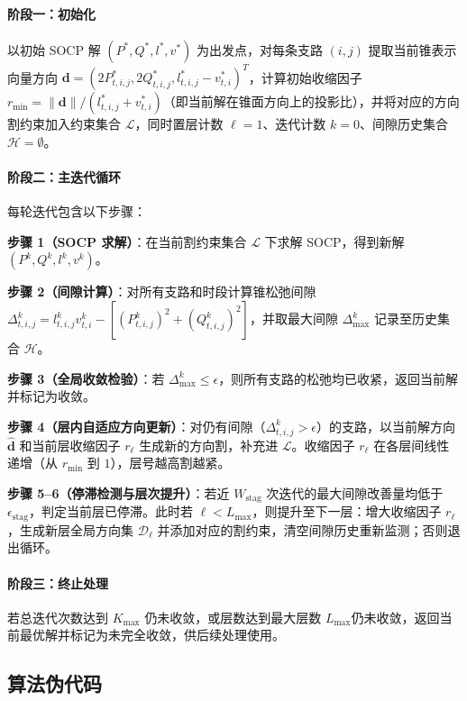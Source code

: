 \documentclass[12pt,a4paper]{article}
\begin{document}
\paragraph{阶段一：初始化}
以初始 SOCP 解 $(P^*, Q^*, l^*, v^*)$ 为出发点，对每条支路 $(i,j)$ 提取当前锥表示向量方向 $\mathbf{d} = (2P^*_{t,i,j}, 2Q^*_{t,i,j}, l^*_{t,i,j}-v^*_{t,i})^T$，计算初始收缩因子 $r_{\min} = \|\mathbf{d}\| / (l^*_{t,i,j} + v^*_{t,i})$（即当前解在锥面方向上的投影比），并将对应的方向割约束加入约束集合 $\mathcal{L}$，同时置层计数 $\ell = 1$、迭代计数 $k = 0$、间隙历史集合 $\mathcal{H} = \emptyset$。

\paragraph{阶段二：主迭代循环}
每轮迭代包含以下步骤：

\textbf{步骤 1（SOCP 求解）}：在当前割约束集合 $\mathcal{L}$ 下求解 SOCP，得到新解 $(P^k, Q^k, l^k, v^k)$。

\textbf{步骤 2（间隙计算）}：对所有支路和时段计算锥松弛间隙 $\Delta^k_{t,i,j} = l^k_{t,i,j} v^k_{t,i} - [(P^k_{t,i,j})^2 + (Q^k_{t,i,j})^2]$，并取最大间隙 $\Delta^k_{\max}$ 记录至历史集合 $\mathcal{H}$。

\textbf{步骤 3（全局收敛检验）}：若 $\Delta^k_{\max} \leq \epsilon$，则所有支路的松弛均已收紧，返回当前解并标记为收敛。

\textbf{步骤 4（层内自适应方向更新）}：对仍有间隙（$\Delta^k_{t,i,j} > \epsilon$）的支路，以当前解方向 $\hat{\mathbf{d}}$ 和当前层收缩因子 $r_\ell$ 生成新的方向割，补充进 $\mathcal{L}$。收缩因子 $r_\ell$ 在各层间线性递增（从 $r_{\min}$ 到 $1$），层号越高割越紧。

\textbf{步骤 5--6（停滞检测与层次提升）}：若近 $W_{\text{stag}}$ 次迭代的最大间隙改善量均低于 $\epsilon_{\text{stag}}$，判定当前层已停滞。此时若 $\ell < L_{\max}$，则提升至下一层：增大收缩因子 $r_\ell$，生成新层全局方向集 $\mathcal{D}_\ell$ 并添加对应的割约束，清空间隙历史重新监测；否则退出循环。

\paragraph{阶段三：终止处理}
若总迭代次数达到 $K_{\max}$ 仍未收敛，或层数达到最大层数 $L_{\max}$仍未收敛，返回当前最优解并标记为未完全收敛，供后续处理使用。
\subsection{算法伪代码}
\end{document}

